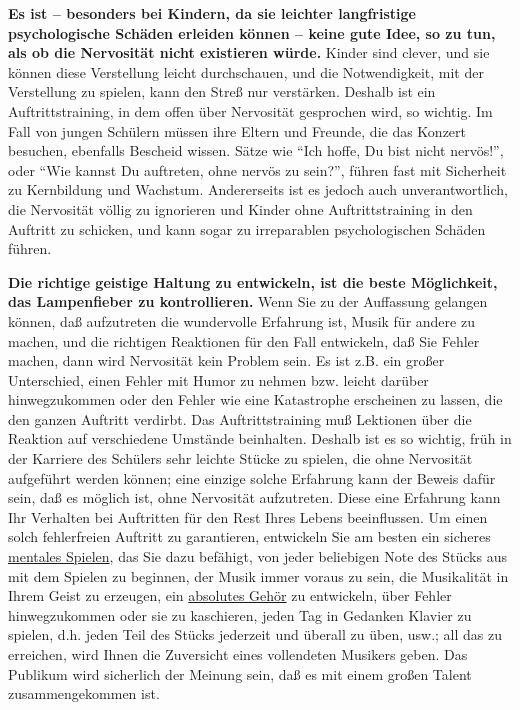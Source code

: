 \textbf{Es ist -- besonders bei Kindern, da sie leichter langfristige psychologische Schäden erleiden können -- keine gute Idee, so zu tun, als ob die Nervosität nicht existieren würde.}
Kinder sind clever, und sie können diese Verstellung leicht durchschauen, und die Notwendigkeit, mit der Verstellung zu spielen, kann den Streß nur verstärken.
Deshalb ist ein Auftrittstraining, in dem offen über Nervosität gesprochen wird, so wichtig.
Im Fall von jungen Schülern müssen ihre Eltern und Freunde, die das Konzert besuchen, ebenfalls Bescheid wissen.
Sätze wie \enquote{Ich hoffe, Du bist nicht nervös!}, oder \enquote{Wie kannst Du auftreten, ohne nervös zu sein?}, führen fast mit Sicherheit zu Kernbildung und Wachstum.
Andererseits ist es jedoch auch unverantwortlich, die Nervosität völlig zu ignorieren und Kinder ohne Auftrittstraining in den Auftritt zu schicken, und kann sogar zu irreparablen psychologischen Schäden führen.

\textbf{Die richtige geistige Haltung zu entwickeln, ist die beste Möglichkeit, das Lampenfieber zu kontrollieren.}
Wenn Sie zu der Auffassung gelangen können, daß aufzutreten die wundervolle Erfahrung ist, Musik für andere zu machen, und die richtigen Reaktionen für den Fall entwickeln, daß Sie Fehler machen, dann wird Nervosität kein Problem sein.
Es ist z.B. ein großer Unterschied, einen Fehler mit Humor zu nehmen bzw. leicht darüber hinwegzukommen oder den Fehler wie eine Katastrophe erscheinen zu lassen, die den ganzen Auftritt verdirbt.
Das Auftrittstraining muß Lektionen über die Reaktion auf verschiedene Umstände beinhalten.
Deshalb ist es so wichtig, früh in der Karriere des Schülers sehr leichte Stücke zu spielen, die ohne Nervosität aufgeführt werden können; eine einzige solche Erfahrung kann der Beweis dafür sein, daß es möglich ist, ohne Nervosität aufzutreten.
Diese eine Erfahrung kann Ihr Verhalten bei Auftritten für den Rest Ihres Lebens beeinflussen.
Um einen solch fehlerfreien Auftritt zu garantieren, entwickeln Sie am besten ein sicheres \hyperref[c1ii12mental]{mentales Spielen}, das Sie dazu befähigt, von jeder beliebigen Note des Stücks aus mit dem Spielen zu beginnen, der Musik immer voraus zu sein, die Musikalität in Ihrem Geist zu erzeugen, ein \hyperref[c1iii12]{absolutes Gehör} zu entwickeln, über Fehler hinwegzukommen oder sie zu kaschieren, jeden Tag in Gedanken Klavier zu spielen, d.h. jeden Teil des Stücks jederzeit und überall zu üben, usw.; all das zu erreichen, wird Ihnen die Zuversicht eines vollendeten Musikers geben.
Das Publikum wird sicherlich der Meinung sein, daß es mit einem großen Talent zusammengekommen ist.

